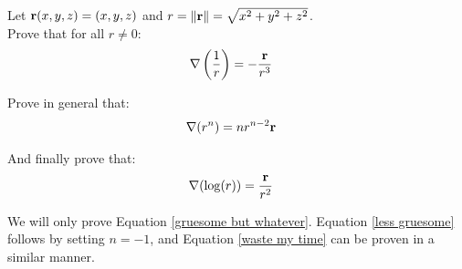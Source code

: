 \begin{tcolorbox}[
        title={Problem 38 (a)},
        valign=center,
        nobeforeafter,
        colframe=gray!95!black
    ]
    Let \(\vb{r}(x, y, z) = (x, y, z)\) and \(r = \|\vb{r}\| = \sqrt{x^2 + y^2 + z^2}\). \\
    
    Prove that for all \(r \neq 0\):
    \begin{align}
        \nabla\left(\frac{1}{r}\right) &= -\frac{\vb{r}}{r^3} \label{less gruesome}
    \end{align}
    
    Prove in general that:
    \begin{align}
        \nabla(r^n) &= n r^{n - 2}\vb{r} \label{gruesome but whatever}
    \end{align}
    
    And finally prove that:
    \begin{align}
        \nabla(\log(r)) &= \frac{\vb{r}}{r^2} \label{waste my time}
    \end{align}
\end{tcolorbox}

We will only prove Equation \eqref{gruesome but whatever}. Equation \eqref{less gruesome} follows by setting \(n = -1\), and Equation \eqref{waste my time} can be proven in a similar manner. 

